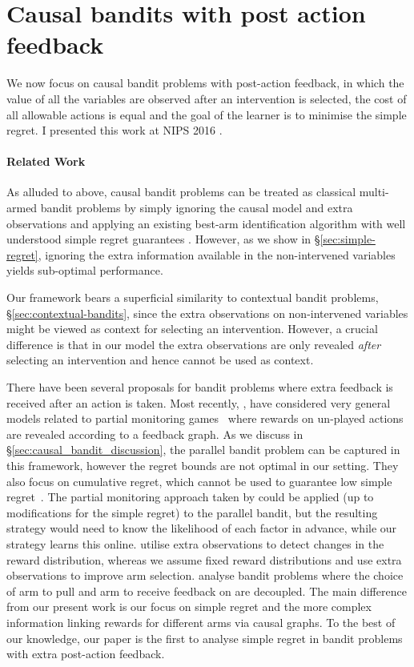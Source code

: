 \documentclass[11pt,a4paper,oneside]{book}
\theoremstyle{plain}
\theoremstyle{definition}
\begin{document}
\section{Causal bandits with post action feedback}

We now focus on causal bandit problems with post-action feedback, in which the value of all the variables are observed after an intervention is selected, the cost of all allowable actions is equal and the goal of the learner is to minimise the simple regret. I presented this work at NIPS 2016 \citep{NIPS2016_6195}.

\paragraph{Related Work} As alluded to above, causal bandit problems can be treated as classical multi-armed bandit problems by simply ignoring the causal model and extra observations and applying an existing best-arm identification algorithm with well understood simple regret guarantees \citep{Jamieson2013}. However, as we show in \S\ref{sec:simple-regret}, ignoring the extra information available in the non-intervened variables yields sub-optimal performance.

Our framework bears a superficial similarity to contextual bandit problems, \S\ref{sec:contextual-bandits}, since the extra observations on non-intervened variables might be viewed as context for selecting an intervention. 
However, a crucial difference is that in our model the extra observations are only revealed \emph{after} selecting an intervention and hence cannot be used as context. 

There have been several proposals for bandit problems where extra feedback is received after an action is taken.
Most recently, \citet{Alon2015}, \citet{Kocak2014} have considered very general models related to partial monitoring games~\citep{Bartok2014} where rewards on un-played actions are revealed according to a feedback graph. As we discuss in \S\ref{sec:causal_bandit_discussion}, the parallel bandit problem can be captured in this framework, however the regret bounds are not optimal in our setting. They also focus on cumulative regret, which cannot be used to guarantee low simple regret~\citep{Bubeck2009a}. The partial monitoring approach taken by \citet{wu2015online} could be applied (up to modifications for the simple regret) to the parallel bandit, but the resulting strategy would need to know the likelihood of each factor in advance, while our strategy learns this online. \citet{Yu2009} utilise extra observations to detect changes in the reward distribution, whereas we assume fixed reward distributions and use extra observations to improve arm selection. \citet{Avner2012} analyse bandit problems where the choice of arm to pull and arm to receive feedback on are decoupled. The main difference from our present work is our focus on simple regret and the more complex information linking rewards for different arms via causal graphs. To the best of our knowledge, our paper is the first to analyse simple regret in bandit problems with extra post-action feedback.
\end{document}
